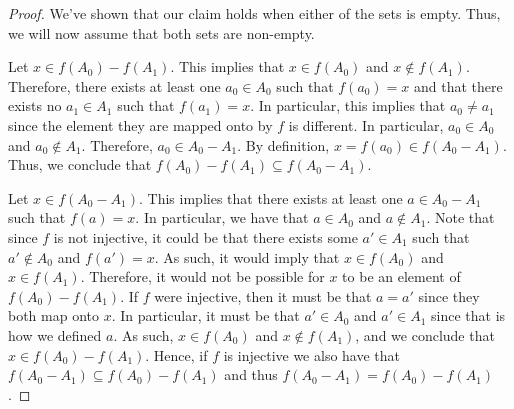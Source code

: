 \documentclass[12pt]{article}
\begin{document}
\begin{enumerate}
\begin{proof}
		We've shown that our claim holds when either of the sets is empty. Thus, we 
		will now assume that both sets are non-empty.
		
		Let $x \in f(A_0) - f(A_1)$. This implies that $x \in f(A_0)$ and $x \notin f(A_1)$.
		Therefore, there exists at least one $a_0 \in A_0$ such that $f(a_0) = x$
		and that there exists no $a_1 \in A_1$ such that $f(a_1) = x$. In particular,
		this implies that $a_0 \neq a_1$ since the element they are mapped onto by $f$
		is different. In particular, $a_0 \in A_0$ and $a_0 \notin A_1$. Therefore,
		$a_0 \in A_0 - A_1$. By definition, $x = f(a_0) \in f(A_0 - A_1)$. Thus,
		we conclude that $f(A_0) - f(A_1) \subseteq f(A_0 - A_1)$.
		
		Let $x \in f(A_0 - A_1)$. This implies that there exists at least one 
		$a \in A_0 - A_1$ such that $f(a) = x$. In particular, we have that $a \in A_0$
		and $a \notin A_1$. Note that since $f$ is not injective, it could be that
		there exists some $a' \in A_1$ such that $a' \notin A_0$ and $f(a') = x$.
		As such, it would imply that $x \in f(A_0)$ and $x \in f(A_1)$. Therefore,
		it would not be possible for $x$ to be an element of $f(A_0) - f(A_1)$.
		If $f$ were injective, then it must be that $a = a'$ since they both map onto $x$.
		In particular, it must be that $a' \in A_0$ and $a' \in A_1$ since that 
		is how we defined $a$. As such, $x \in f(A_0)$ and $x \notin f(A_1)$,
		and we conclude that $x \in f(A_0) - f(A_1)$. Hence, if $f$ is injective
		we also have that $f(A_0 - A_1) \subseteq f(A_0) - f(A_1)$ and thus
		$f(A_0 - A_1) = f(A_0) - f(A_1)$.
	\end{proof}
\end{enumerate}
\end{document}
